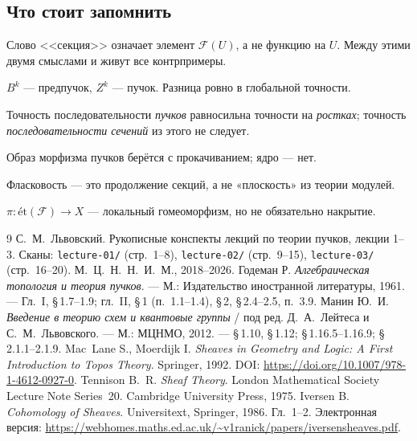 \documentclass[11pt,b5paper]{article}
\newcommand{\et}{\text{ét}}
\newcommand{\Shv}[1]{\mathscr{#1}}   %
\theoremstyle{plain}
\theoremstyle{definition}
\theoremstyle{remark}
\theoremstyle{definition}
\let\brutsubsection\subsection
\renewcommand{\subsection}{\Needspace{5\baselineskip}\brutsubsection}
\begin{document}
\subsection{Что стоит запомнить}
\begin{bullets}
\item Слово <<секция>> означает элемент $\Shv{F}(U)$, а не функцию на
  $U$. Между этими двумя смыслами и живут все контрпримеры.
\item $B^k$ --- предпучок, $Z^k$ --- пучок. Разница ровно в
  глобальной точности.
\item Точность последовательности \emph{пучков} равносильна точности
  на \emph{ростках}; точность \emph{последовательности сечений} из
  этого не следует.
\item Образ морфизма пучков берётся с прокачиванием; ядро ---
  нет.
\item Фласковость --- это продолжение секций, а не «плоскость» из
  теории модулей.
\item $\pi\colon\et(\Shv{F})\to X$ --- локальный гомеоморфизм, но
  не обязательно накрытие.
\end{bullets}

\begin{thebibliography}{9}
 С.~М.~Львовский. Рукописные конспекты лекций по теории пучков,
 лекции 1--3. Сканы: \textenglish{\texttt{lecture-01/}}
 (стр.~1--8), \textenglish{\texttt{lecture-02/}}
 (стр.~9--15), \textenglish{\texttt{lecture-03/}} (стр.~16--20).
 М.~Ц.~Н.~Н.~И.~М., 2018--2026.
 Годеман Р. \emph{Алгебраическая топология и теория пучков}. --- М.:
 Издательство иностранной литературы, 1961. --- Гл.~I, \S\,1.7--1.9;
 гл.~II, \S\,1 (п.~1.1--1.4), \S\,2, \S\,2.4--2.5, п.~3.9.
 Манин Ю.~И. \emph{Введение в теорию схем и квантовые группы} / под
 ред. Д.~А.~Лейтеса и С.~М.~Львовского. --- М.: МЦНМО, 2012. ---
 \S\,1.10, \S\,1.12; \S\,1.16.5--1.16.9; \S\,2.1.1--2.1.9.
 Mac~Lane S., Moerdijk I. \emph{Sheaves in Geometry and Logic: A First
 Introduction to Topos Theory}. Springer, 1992.
 DOI: \textenglish{\url{https://doi.org/10.1007/978-1-4612-0927-0}}.
 Tennison B.~R. \emph{Sheaf Theory}. London Mathematical Society Lecture
 Note Series~20. Cambridge University Press, 1975.
 Iversen B. \emph{Cohomology of Sheaves}. Universitext, Springer, 1986.
 Гл.~1--2. Электронная версия:
 \textenglish{\url{https://webhomes.maths.ed.ac.uk/~v1ranick/papers/iversensheaves.pdf}}.
\end{thebibliography}
\end{document}
